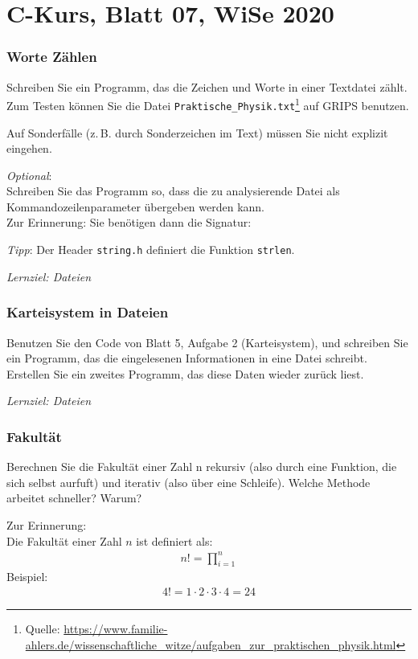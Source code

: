 \documentclass[
	ngerman,
	fontsize=10pt,
	parskip=half,
	titlepage=true,
	DIV=12
]{scrartcl}
\begin{document}
\part*{C-Kurs, Blatt 07, WiSe 2020}

\section{Worte Zählen}
Schreiben Sie ein Programm, das die Zeichen  und Worte in einer Textdatei zählt. Zum Testen können Sie die Datei \texttt{Praktische\_Physik.txt}\footnote{Quelle: \url{https://www.familie-ahlers.de/wissenschaftliche_witze/aufgaben_zur_praktischen_physik.html}} auf GRIPS benutzen.

Auf Sonderfälle (z.\,B. durch Sonderzeichen im Text) müssen Sie nicht explizit eingehen.

\emph{Optional}:\\
Schreiben Sie das Programm so, dass die zu analysierende Datei als Kommandozeilenparameter übergeben werden kann.\\
Zur Erinnerung: Sie benötigen dann die Signatur:

\emph{Tipp}: 
Der Header \texttt{string.h} definiert die Funktion \texttt{strlen}.

\emph{Lernziel: Dateien}

\section{Karteisystem in Dateien}
Benutzen Sie den Code von Blatt 5, Aufgabe 2 (Karteisystem), und schreiben Sie ein Programm, das die eingelesenen Informationen in eine Datei schreibt. Erstellen Sie ein zweites Programm, das diese Daten wieder zurück liest.

\emph{Lernziel: Dateien}

\section{Fakultät}
Berechnen Sie die Fakultät einer Zahl n rekursiv (also durch eine Funktion, die sich selbst aurfuft) und iterativ (also über eine Schleife). Welche Methode arbeitet schneller? Warum?

Zur Erinnerung:\\
Die Fakultät einer Zahl $n$ ist definiert als:
\begin{align*}
	n! = \prod_{i=1}^{n}
\end{align*}
Beispiel:
\begin{align*}
	4! = 1 \cdot 2 \cdot 3  \cdot 4 = 24
\end{align*}
\end{document}
